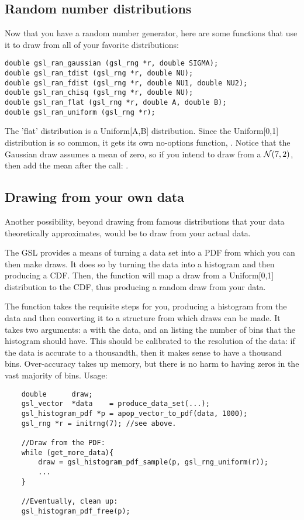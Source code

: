 \subsection{Random number distributions}
Now that you have a random number generator, here are some functions that use it to draw from all of your favorite distributions:
  
 


\begin{lstlisting}
double gsl_ran_gaussian (gsl_rng *r, double SIGMA);
double gsl_ran_tdist (gsl_rng *r, double NU);
double gsl_ran_fdist (gsl_rng *r, double NU1, double NU2);
double gsl_ran_chisq (gsl_rng *r, double NU);
double gsl_ran_flat (gsl_rng *r, double A, double B);
double gsl_ran_uniform (gsl_rng *r);
\end{lstlisting}

The 'flat' distribution is a Uniform[A,B] distribution. Since the
Uniform[0,1] distribution is so common, it gets its own no-options
function, . Notice that the Gaussian draw
assumes a mean of zero, so if you intend to draw from a ${\cal N}(7,2)$,
then add the mean after the call: .

\subsection{Drawing from your own data} Another possibility, beyond
drawing from famous distributions that your data theoretically
approximates, would be to draw from your actual data. 

The GSL provides a means of turning a data set into a PDF from which you
can then make draws.  It
does so by turning the data into a histogram and then producing a CDF.
Then, the  function will
map a draw from a Uniform[0,1] distribution to the CDF, thus producing a
random draw from your data.

The  function takes the requisite steps
for you, producing a histogram from the data and then converting it to
a  structure from which draws can be
made. It takes two arguments: a  with the data, and
an  listing the number of bins that the histogram should
have. This should be calibrated to the resolution of the data: if the
data is accurate to a thousandth, then it makes sense to have a thousand
bins. Over-accuracy takes up memory, but there is no harm to having
zeros in the vast majority of bins. Usage:
\begin{lstlisting}
    double      draw;
    gsl_vector  *data    = produce_data_set(...);
    gsl_histogram_pdf *p = apop_vector_to_pdf(data, 1000);
    gsl_rng *r = initrng(7); //see above.

    //Draw from the PDF:
    while (get_more_data){
        draw = gsl_histogram_pdf_sample(p, gsl_rng_uniform(r));
        ...
    }

    //Eventually, clean up:
    gsl_histogram_pdf_free(p);
\end{lstlisting}


